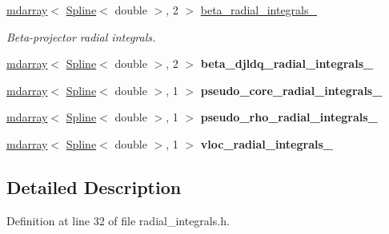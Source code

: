 \begin{DoxyCompactItemize}
\item 
\hyperlink{classsddk_1_1mdarray}{mdarray}$<$ \hyperlink{classsirius_1_1_spline}{Spline}$<$ double $>$, 2 $>$ \hyperlink{classsirius_1_1_radial__integrals_addcbf237e71e82add5251cc5ad4061a2}{beta\+\_\+radial\+\_\+integrals\+\_\+}
\begin{DoxyCompactList}\small\item\em Beta-\/projector radial integrals. \end{DoxyCompactList}\item 
\hypertarget{classsirius_1_1_radial__integrals_aac13d6be24d5ca1d341ed902f7526fac}{}\hyperlink{classsddk_1_1mdarray}{mdarray}$<$ \hyperlink{classsirius_1_1_spline}{Spline}$<$ double $>$, 2 $>$ {\bfseries beta\+\_\+djldq\+\_\+radial\+\_\+integrals\+\_\+}\label{classsirius_1_1_radial__integrals_aac13d6be24d5ca1d341ed902f7526fac}

\item 
\hypertarget{classsirius_1_1_radial__integrals_a0269866d49754d94d4ef94e4698109a0}{}\hyperlink{classsddk_1_1mdarray}{mdarray}$<$ \hyperlink{classsirius_1_1_spline}{Spline}$<$ double $>$, 1 $>$ {\bfseries pseudo\+\_\+core\+\_\+radial\+\_\+integrals\+\_\+}\label{classsirius_1_1_radial__integrals_a0269866d49754d94d4ef94e4698109a0}

\item 
\hypertarget{classsirius_1_1_radial__integrals_aa18b2c0350c98d07dee24b51a07900b5}{}\hyperlink{classsddk_1_1mdarray}{mdarray}$<$ \hyperlink{classsirius_1_1_spline}{Spline}$<$ double $>$, 1 $>$ {\bfseries pseudo\+\_\+rho\+\_\+radial\+\_\+integrals\+\_\+}\label{classsirius_1_1_radial__integrals_aa18b2c0350c98d07dee24b51a07900b5}

\item 
\hypertarget{classsirius_1_1_radial__integrals_a98543f2daf20d9c9137182ff036635c6}{}\hyperlink{classsddk_1_1mdarray}{mdarray}$<$ \hyperlink{classsirius_1_1_spline}{Spline}$<$ double $>$, 1 $>$ {\bfseries vloc\+\_\+radial\+\_\+integrals\+\_\+}\label{classsirius_1_1_radial__integrals_a98543f2daf20d9c9137182ff036635c6}

\end{DoxyCompactItemize}


\subsection{Detailed Description}


Definition at line 32 of file radial\+\_\+integrals.\+h.



